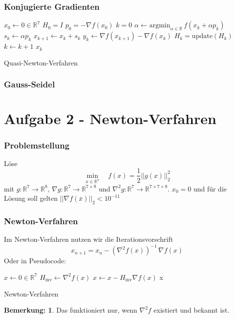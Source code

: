 \documentclass[xcolor = dvipsnames, notheorems, 10pt]{beamer}
\newcommand{\vth}{\vspace{4pt}}
\theoremstyle{definition}
\newtheorem{remark}		{Bemerkung:\vth}
\begin{document}
\begin{frame}
\frametitle{Konjugierte Gradienten}
	\begin{algorithm}[H]
		\begin{algorithmic}[1]
			\STATE $x_0 \gets 0 \in \mathbb{R}^7$
			\STATE $H_0 = I$
			\STATE $p_0 = -\nabla f(x_0)$
			\STATE $k = 0$
				\STATE $\alpha \gets \text{argmin}_{\alpha \in \mathbb{R}}\, f(x_k + \alpha p_k)$
				\STATE $s_k \gets \alpha p_k$
				\STATE $x_{k+1} \gets x_k+s_k$
				\STATE $y_k \gets \nabla f(x_{k+1}) - \nabla f(x_k)$
				\STATE $H_k = \text{update}(H_k)$
				\STATE $k \gets k+1$
			\ENDWHILE
			\RETURN $x_k$
		\end{algorithmic}
		\caption{Quasi-Newton-Verfahren}
	\end{algorithm}
\end{frame}

\begin{frame}
\frametitle{Gauss-Seidel}

\end{frame}

\section{Aufgabe 2 - Newton-Verfahren}
\begin{frame}
\frametitle{Problemstellung}
	Löse
		$$\min_{x \in \mathbb{R}^7} \quad f(x) = \frac{1}{2}||g(x)||_2^2$$
	mit $g: \mathbb{R}^7 \rightarrow \mathbb{R}^8$, $\nabla g: \mathbb{R}^7 \rightarrow \mathbb{R}^{7 \times 8}$ und $\nabla^2 g: \mathbb{R}^7 \rightarrow \mathbb{R}^{7 \times 7 \times 8}$. $x_0 = 0$ und für die Lösung soll gelten $||\nabla f(\bar x)||_2 < 10^{-11}$
\end{frame}

\begin{frame}
\frametitle{Newton-Verfahren}
	Im Newton-Verfahren nutzen wir die Iterationsvorschrift
	$$x_{n+1} = x_n - (\nabla^2 f(x))^{-1}\, \nabla f(x)$$
	Oder in Pseudocode:
	\begin{algorithm}[H]
		\begin{algorithmic}[1]
			\STATE $x \gets 0 \in \mathbb{R}^7$
				\STATE $H_\text{inv} \gets \nabla^2 f(x)$
				\STATE $x \gets x - H_\text{inv}\nabla f(x)$ 
			\ENDWHILE
			\RETURN x
		\end{algorithmic}
		\caption{Newton-Verfahren}
	\end{algorithm}
	\begin{remark}
		Das funktioniert nur, wenn $\nabla^2 f$ existiert und bekannt ist.
	\end{remark}
\end{frame}
\end{document}
